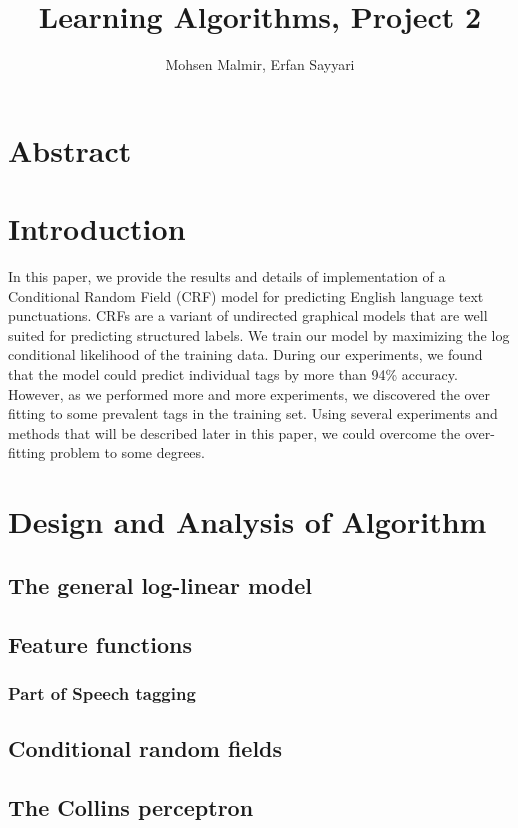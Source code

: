 \documentclass[twoside,12pt]{article}
\begin{document}
\title{Learning Algorithms, Project 2}
\author{Mohsen Malmir, Erfan Sayyari}
\maketitle
\section{Abstract}

\section{Introduction}
In this paper, we provide the results and details of implementation of a Conditional Random Field (CRF) model for predicting English language text punctuations. CRFs are a variant of undirected graphical models that are well suited for predicting structured labels. We train our model by maximizing the log conditional likelihood of the training data. During our experiments, we found that the model could predict individual tags by more than 94\% accuracy. However, as we performed more and more experiments, we discovered the over fitting to some prevalent tags in the training set. Using several experiments and methods that will be described later in this paper, we could overcome the over-fitting problem to some degrees.

 
\section{Design and Analysis of Algorithm}
\subsection{The general log-linear model}
\subsection{Feature functions}
\subsubsection{Part of Speech tagging}
\subsection{Conditional random fields}
\subsection{The Collins perceptron}
\end{document}
